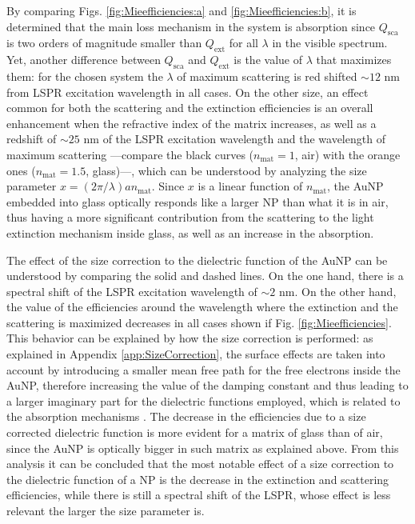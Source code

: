 By comparing Figs. \ref{fig:Mieefficiencies:a} and \ref{fig:Mieefficiencies:b}, it is determined that the main loss mechanism in the system is absorption since $Q_\text{sca}$ is two orders of magnitude smaller than $Q_\text{ext}$ for all $\lambda$ in the visible spectrum. Yet, another difference between  $Q_\text{sca}$ and  $Q_\text{ext}$ is the value of $\lambda$ that maximizes them: for the chosen system the $\lambda$ of maximum scattering is red shifted $\sim 12$ nm from  LSPR excitation wavelength in all cases. On the other size, an effect common for both the scattering and the extinction efficiencies is an overall enhancement  when the refractive index of the matrix increases, as well as a redshift of $\sim 25$ nm of the LSPR excitation wavelength and the wavelength of maximum scattering ---compare the black curves ($n_\text{mat} = 1$, air) with the orange ones ($n_\text{mat} = 1.5$, glass)---, which can be understood by analyzing the size parameter $ x = (2 \pi / \lambda ) a n_\text{mat} $. Since $x$ is a linear function of $n_\text{mat}$, the AuNP embedded into glass optically responds like a larger NP than what it is in air, thus having a more significant contribution from the scattering to the light extinction mechanism inside glass, as well as an increase in the absorption.

The effect of the size correction to the dielectric function of the AuNP can be understood by comparing the solid and dashed lines. On the one hand, there is a spectral shift of the LSPR excitation wavelength  of $\sim 2$ nm. On the other hand, the value of the efficiencies around the wavelength where the extinction and the scattering is maximized decreases in all cases shown if Fig. \ref{fig:Mieefficiencies}.  This behavior can be explained by how the size correction is performed: as explained in Appendix \ref{app:SizeCorrection}, the surface effects are taken into account by introducing a smaller mean free path for the free electrons inside the AuNP, therefore increasing the value of the damping constant and thus leading to a larger imaginary part for the dielectric functions employed, which is related to the absorption mechanisms \cite{ibach_solid-state_2009}. The decrease in the efficiencies due to a size corrected dielectric function is more evident for a matrix of glass than of air, since the AuNP is optically bigger in such matrix as explained above.  From this analysis it can be concluded that the most notable effect of a size correction to the dielectric function of a NP is the decrease in the extinction and scattering efficiencies, while there is still a spectral shift of the LSPR, whose effect is less relevant the larger the size parameter is.

